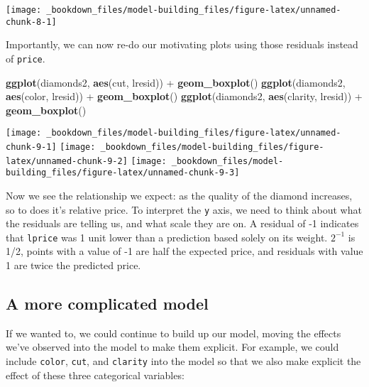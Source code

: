 \documentclass[]{book}
\newenvironment{Shaded}{\begin{snugshade}}{\end{snugshade}}
\newcommand{\KeywordTok}[1]{\textcolor[rgb]{0.13,0.29,0.53}{\textbf{{#1}}}}
\newcommand{\StringTok}[1]{\textcolor[rgb]{0.31,0.60,0.02}{{#1}}}
\newcommand{\NormalTok}[1]{{#1}}
\begin{document}
\begin{center}\texttt{[image: \_bookdown\_files/model-building\_files/figure-latex/unnamed-chunk-8-1]} \end{center}

Importantly, we can now re-do our motivating plots using those residuals
instead of \texttt{price}.

\begin{Shaded}
\begin{Highlighting}[]
\KeywordTok{ggplot}\NormalTok{(diamonds2, }\KeywordTok{aes}\NormalTok{(cut, lresid)) +}\StringTok{ }\KeywordTok{geom_boxplot}\NormalTok{()}
\KeywordTok{ggplot}\NormalTok{(diamonds2, }\KeywordTok{aes}\NormalTok{(color, lresid)) +}\StringTok{ }\KeywordTok{geom_boxplot}\NormalTok{()}
\KeywordTok{ggplot}\NormalTok{(diamonds2, }\KeywordTok{aes}\NormalTok{(clarity, lresid)) +}\StringTok{ }\KeywordTok{geom_boxplot}\NormalTok{()}
\end{Highlighting}
\end{Shaded}

\begin{center}\texttt{[image: \_bookdown\_files/model-building\_files/figure-latex/unnamed-chunk-9-1]} \texttt{[image: \_bookdown\_files/model-building\_files/figure-latex/unnamed-chunk-9-2]} \texttt{[image: \_bookdown\_files/model-building\_files/figure-latex/unnamed-chunk-9-3]} \end{center}

Now we see the relationship we expect: as the quality of the diamond
increases, so to does it's relative price. To interpret the \texttt{y}
axis, we need to think about what the residuals are telling us, and what
scale they are on. A residual of -1 indicates that \texttt{lprice} was 1
unit lower than a prediction based solely on its weight. \(2^{-1}\) is
1/2, points with a value of -1 are half the expected price, and
residuals with value 1 are twice the predicted price.

\subsection{A more complicated model}\label{a-more-complicated-model}

If we wanted to, we could continue to build up our model, moving the
effects we've observed into the model to make them explicit. For
example, we could include \texttt{color}, \texttt{cut}, and
\texttt{clarity} into the model so that we also make explicit the effect
of these three categorical variables:
\end{document}
